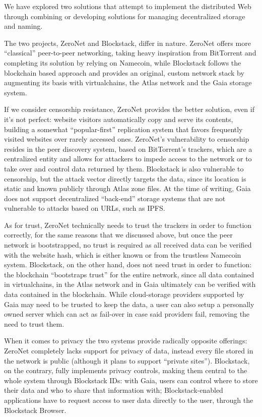 \documentclass[mscthesis]{usiinfthesis}
\begin{document}
We have explored two solutions that attempt to implement the distributed Web through combining or developing solutions for managing decentralized storage and naming.

The two projects, ZeroNet and Blockstack, differ in nature. ZeroNet offers more ``classical'' peer-to-peer networking, taking heavy inspiration from BitTorrent and completing its solution by relying on Namecoin, while Blockstack follows the blockchain based approach and provides an original, custom network stack by augmenting its basis with virtualchains, the Atlas network and the Gaia storage system.

If we consider censorship resistance, ZeroNet provides the better solution, even if it's not perfect: website visitors automatically copy and serve its contents, building a somewhat ``popular-first'' replication system that favors frequently visited websites over rarely accessed ones. ZeroNet's vulnerability to censorship resides in the peer discovery system, based on BitTorrent's trackers, which are a centralized entity and allows for attackers to impede access to the network or to take over and control data returned by them. Blockstack is also vulnerable to censorship, but the attack vector directly targets the data, since its location is static and known publicly through Atlas zone files. At the time of writing, Gaia does not support decentralized ``back-end'' storage systems that are not vulnerable to attacks based on URLs, such as IPFS.

As for trust, ZeroNet technically needs to trust the trackers in order to function correctly, for the same reasons that we discussed above, but once the peer network is bootstrapped, no trust is required as all received data can be verified with the website hash, which is either known or from the trustless Namecoin system. Blockstack, on the other hand, does not need trust in order to function: the blockchain ``bootstraps trust'' for the entire network, since all data contained in virtualchains, in the Atlas network and in Gaia ultimately can be verified with data contained in the blockchain. While cloud-storage providers supported by Gaia may need to be trusted to keep the data, a user can also setup a personally owned server which can act as fail-over in case said providers fail, removing the need to trust them.

When it comes to privacy the two systems provide radically opposite offerings: ZeroNet completely lacks support for privacy of data, instead every file stored in the network is public (although it plans to support ``private sites''). Blockstack, on the contrary, fully implements privacy controls, making them central to the whole system through Blockstack IDs: with Gaia, users can control where to store their data and who to share that information with; Blockstack-enabled applications have to request access to user data directly to the user, through the Blockstack Browser.
\end{document}
